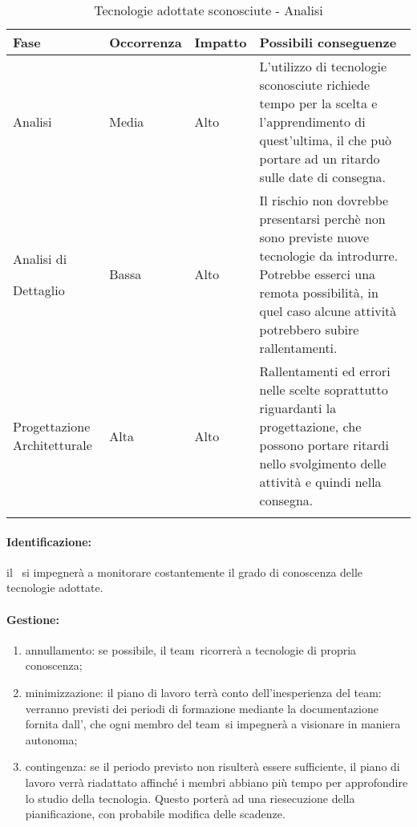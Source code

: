 \documentclass[../PianoProgetto.tex]{subfiles}
\begin{document}
	\begin{table}[h]
		\centering
		\begin{tabularx}{\textwidth}{F O O P}
			\toprule
			\textbf{Fase} & \textbf{Occorrenza} & \textbf{Impatto} & \textbf{Possibili conseguenze}\\
			\midrule
			Analisi & Media & Alto & L'utilizzo di tecnologie sconosciute richiede tempo per la scelta e l'apprendimento di quest'ultima, il che può portare ad un ritardo sulle date di consegna. \\
			\midrule
			Analisi di \par Dettaglio & Bassa & Alto & Il rischio non dovrebbe presentarsi perchè non sono previste nuove tecnologie da introdurre. Potrebbe esserci una remota possibilità, in quel caso alcune attività potrebbero subire rallentamenti. \\
			\midrule
			Progettazione Architetturale & Alta & Alto & Rallentamenti ed errori nelle scelte soprattutto riguardanti la progettazione, che possono portare ritardi nello svolgimento delle attività e quindi nella consegna.\\
			\bottomrule
		\end{tabularx}
		\caption{Tecnologie adottate sconosciute - Analisi}
		\label{tab:Tecnologie adottate sconosciute - Analisi}	
	\end{table} 
	
	\paragraph*{Identificazione:} il \responsabilediprogetto\ si impegnerà a monitorare costantemente il grado di conoscenza delle tecnologie adottate.	
	
	\paragraph*{Gestione:}
	\begin{enumerate}
		\item annullamento: se possibile, il team\g\ ricorrerà a tecnologie di propria conoscenza;
		\item minimizzazione: il piano di lavoro terrà conto dell'inesperienza del team\g : verranno previsti dei periodi di formazione mediante la documentazione fornita dall'\amministratore , che ogni membro del team\g\ si impegnerà a visionare in maniera autonoma;
		\item contingenza: se il periodo previsto non risulterà essere sufficiente, il piano di lavoro verrà riadattato affinché i membri abbiano più tempo per approfondire lo studio della tecnologia. Questo porterà ad una riesecuzione della pianificazione, con probabile modifica delle scadenze.
	\end{enumerate}
	
\end{document}
